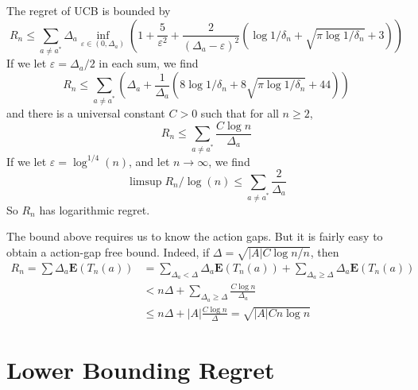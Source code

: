 \begin{theorem}
    The regret of UCB is bounded by
    \[ R_n \leq \sum_{a \neq a^*} \Delta_a \inf_{\varepsilon \in (0,\Delta_a)} \left(1 + \frac{5}{\varepsilon^2} + \frac{2}{(\Delta_a - \varepsilon)^2} \left(\log 1/\delta_n + \sqrt{\pi \log 1/\delta_n} + 3\right) \right) \]
    If we let $\varepsilon = \Delta_a/2$ in each sum, we find
    \[ R_n \leq \sum_{a \neq a^*} \left( \Delta_a + \frac{1}{\Delta_a} \left( 8 \log 1/\delta_n + 8 \sqrt{\pi \log 1 / \delta_n} + 44 \right) \right) \]
    and there is a universal constant $C > 0$ such that for all $n \geq 2$,
    \[ R_n \leq \sum_{a \neq a^*} \frac{C \log n}{\Delta_a} \]
    If we let $\varepsilon = \log^{1/4}(n)$, and let $n \to \infty$, we find
    \[ \limsup R_n/\log(n) \leq \sum_{a \neq a^*} \frac{2}{\Delta_a} \]
    So $R_n$ has logarithmic regret.
\end{theorem}

The bound above requires us to know the action gaps. But it is fairly easy to obtain a action-gap free bound. Indeed, if $\Delta = \sqrt{|A| C \log n / n}$, then
%
\begin{align*}
    R_n = \sum \Delta_a \mathbf{E}(T_n(a)) &= \sum_{\Delta_a < \Delta} \Delta_a \mathbf{E}(T_n(a)) + \sum_{\Delta_a \geq \Delta} \Delta_a \mathbf{E}(T_n(a))\\
    &< n \Delta + \sum_{\Delta_a \geq \Delta} \frac{C \log n}{\Delta_a}\\
    &\leq n \Delta + |A| \frac{C \log n}{\Delta} = \sqrt{|A| C n \log n}
\end{align*}

\chapter{Lower Bounding Regret}

